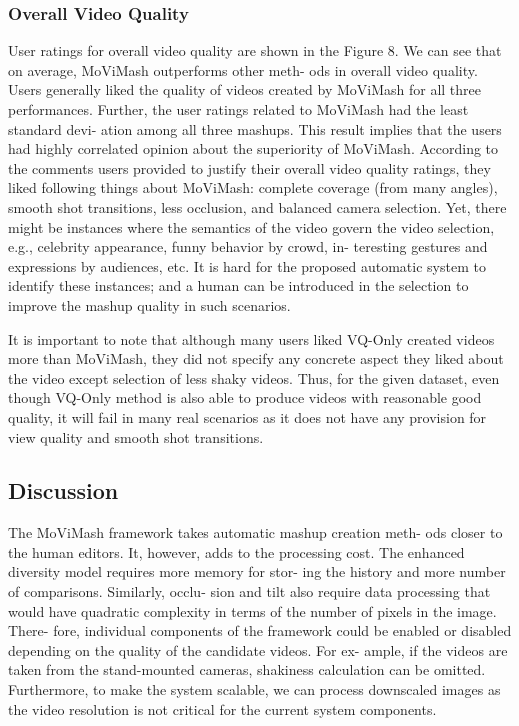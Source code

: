 \documentclass{sig-alternate}
\begin{document}
\subsubsection{Overall Video Quality}
User ratings for overall video quality are shown in the Figure 8.
We can see that on average, MoViMash outperforms other meth-
ods in overall video quality. Users generally liked the quality of
videos created by MoViMash for all three performances. Further,
the user ratings related to MoViMash had the least standard devi-
ation among all three mashups. This result implies that the users
had highly correlated opinion about the superiority of MoViMash.
According to the comments users provided to justify their overall
video quality ratings, they liked following things about MoViMash:
complete coverage (from many angles), smooth shot transitions,
less occlusion, and balanced camera selection. Yet, there might
be instances where the semantics of the video govern the video
selection, e.g., celebrity appearance, funny behavior by crowd, in-
teresting gestures and expressions by audiences, etc. It is hard for
the proposed automatic system to identify these instances; and a
human can be introduced in the selection to improve the mashup
quality in such scenarios.

It is important to note that although many users liked VQ-Only
created videos more than MoViMash, they did not specify any concrete aspect they liked about the video except selection of less
shaky videos. Thus, for the given dataset, even though VQ-Only
method is also able to produce videos with reasonable good quality,
it will fail in many real scenarios as it does not have any provision
for view quality and smooth shot transitions.

\subsection{Discussion}
The MoViMash framework takes automatic mashup creation meth-
ods closer to the human editors. It, however, adds to the processing
cost. The enhanced diversity model requires more memory for stor-
ing the history and more number of comparisons. Similarly, occlu-
sion and tilt also require data processing that would have quadratic
complexity in terms of the number of pixels in the image. There-
fore, individual components of the framework could be enabled or
disabled depending on the quality of the candidate videos. For ex-
ample, if the videos are taken from the stand-mounted cameras,
shakiness calculation can be omitted. Furthermore, to make the
system scalable, we can process downscaled images as the video
resolution is not critical for the current system components.
\end{document}
